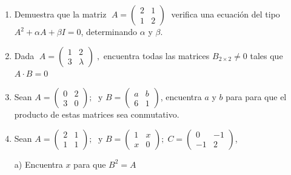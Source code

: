 \begin{enumerate}
\rightline{\textcolor{gris}{$x=1; \; y=2; \; z=1$}}

\item \normalsize{Demuestra que la matriz} $\;A=\left( \begin{matrix} 2&1\\1&2  \end{matrix}\right)\;$ verifica una ecuación del tipo $A^2+\alpha A+\beta I=0$, determinando $\alpha$ y $\beta$.

\rightline{\textcolor{gris}{Solución:  $\alpha=-4; \; \beta=3; \; \; A^2-4A+3I=0$  }}	
\item Dada $\;A=\left( \begin{matrix} 1&2\\3&\lambda \end{matrix}\right)\;,$ encuentra todas las matrices $B_{2\times 2}\neq 0$ tales que $A\cdot B=0$



\item Sean $ A=\left( \begin{array}{cc} 0&2\\3&0   \end{array} \right); \;
\text { y } B=\left( \begin{array}{cc} a&b\\6&1  \end{array}\right)$, encuentra $a$ y $b$ para para que el producto de estas matrices sea conmutativo.

\rightline{\textcolor{gris}{Solución: $a=1; \; b=4$}}

\item Sean $ A=\left( \begin{array}{cc} 2&1\\1&1   \end{array} \right); \;
\text { y } B=\left( \begin{array}{cc} 1&x\\x&0  \end{array}\right); \;
C=\left( \begin{array}{cc} 0&-1\\-1&2   \end{array} \right)$, 

a) Encuentra $x$ para que $B^2=A$


\end{enumerate}
